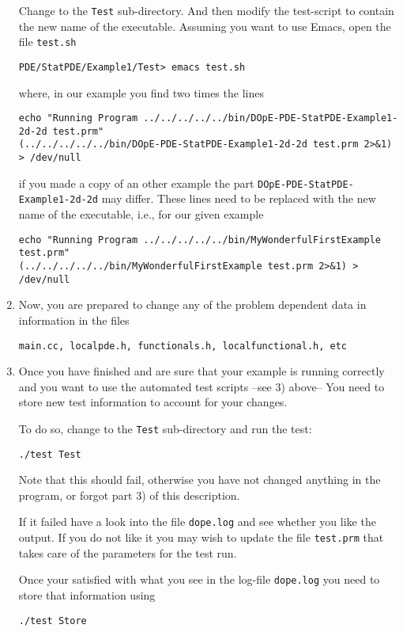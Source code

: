 \begin{enumerate}
  Change to the \texttt{Test} sub-directory. And then modify the
  test-script to contain the new name of the executable.
  Assuming you want to use Emacs, open the file \texttt{test.sh}
\begin{verbatim}
PDE/StatPDE/Example1/Test> emacs test.sh
\end{verbatim}
where, in our example you find two times the lines
\begin{verbatim}
echo "Running Program ../../../../../bin/DOpE-PDE-StatPDE-Example1-2d-2d test.prm"
(../../../../../bin/DOpE-PDE-StatPDE-Example1-2d-2d test.prm 2>&1) > /dev/null
\end{verbatim} 
if you made a copy of an other example the part \texttt{DOpE-PDE-StatPDE-Example1-2d-2d}
may differ. These lines need to be replaced with the new name of the 
executable, i.e., for our given example
\begin{verbatim}
echo "Running Program ../../../../../bin/MyWonderfulFirstExample test.prm"
(../../../../../bin/MyWonderfulFirstExample test.prm 2>&1) > /dev/null
\end{verbatim} 

\item  Now, you are prepared to change any of the problem
  dependent data in information in the files 
\begin{verbatim}
main.cc, localpde.h, functionals.h, localfunctional.h, etc
\end{verbatim} 

\item Once you have finished and are sure that your example is running correctly
  and you want to use the automated test scripts --see 3) above-- You need 
  to store new test information to account for your changes. 
  
  To do so, change to the \texttt{Test} sub-directory and run the test:
\begin{verbatim}
./test Test
\end{verbatim}
  Note that this should fail, otherwise you have not changed anything in the program, 
  or forgot part 3) of this description.
  
  If it failed have a look into the file \texttt{dope.log} and see whether you like the 
  output. If you do not like it you may wish to update the file \texttt{test.prm} that 
  takes care of the parameters for the test run.
  
  Once your satisfied with what you see in the log-file \texttt{dope.log} you need to store 
  that information using
\begin{verbatim}
./test Store
\end{verbatim}
\end{enumerate}


